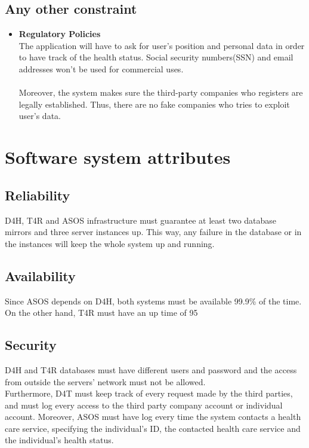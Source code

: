 \documentclass[hidelinks, 12pt]{report}
\begin{document}
\subsection{Any other constraint}
\begin{itemize}
\item{} \textbf{Regulatory Policies}\\
The application will have to ask for user's position and personal data in order to have track of the health status. Social security numbers(SSN) and email addresses won't be used for commercial uses.\\\\
Moreover, the system makes sure the third-party companies who registers are legally established. Thus, there are no fake companies who tries to exploit user's data.
\end{itemize}
\section{Software system attributes}

\subsection{Reliability}
D4H, T4R and ASOS infrastructure must guarantee at least two database mirrors and three server instances up. This way, any failure in the database or in the instances will keep the whole system up and running.

\subsection{Availability}
Since ASOS depends on D4H, both systems must be available 99.9\% of the time. On the other hand, T4R must have an up time of 95%

\subsection{Security}
D4H and T4R databases must have different users and password and the access from outside the servers' network must not be allowed.\\

Furthermore, D4T must keep track of every request made by the third parties, and must log every access to the third party company account or individual account. Moreover, ASOS must have log every time the system contacts a health care service, specifying the individual's ID, the contacted health care service and the individual's health status. \\
\end{document}
